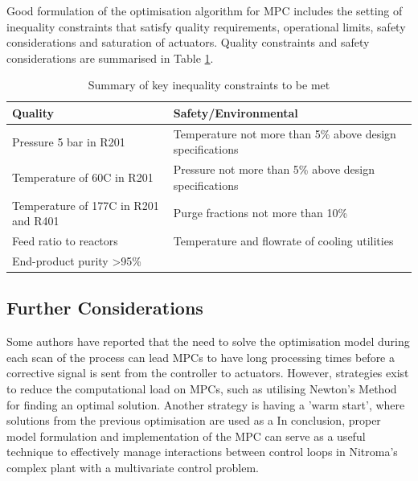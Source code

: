 Good formulation of the optimisation algorithm for MPC includes the setting of inequality constraints that satisfy quality requirements, operational limits, safety considerations and saturation of actuators. Quality constraints and safety considerations are summarised in Table \ref{tab:key-constraints}.

\begin{table}[h]
\centering
    \caption{Summary of key inequality constraints to be met}
    \label{tab:key-constraints}
\begin{tabular}{@{}ll@{}}
\toprule
\textbf{Quality}                      & \textbf{Safety/Environmental}                             \\ \midrule
Pressure 5 bar in R201                & Temperature not more than 5\% above design specifications \\
Temperature of 60C in R201            & Pressure not more than 5\% above design specifications    \\
Temperature of 177C in R201 and R401  & Purge fractions not more than 10\%                        \\
Feed ratio to reactors                & Temperature and flowrate of cooling utilities             \\
End-product purity \textgreater{}95\% &                                                           \\ \bottomrule
\end{tabular}
\end{table}

\subsection{Further Considerations}
Some authors have reported that the need to solve the optimisation model during each scan of the process can lead MPCs to have long processing times before a corrective signal is sent from the controller to actuators. However, strategies exist to reduce the computational load on MPCs, such as utilising Newton's Method for finding an optimal solution. Another strategy is having a 'warm start', where solutions from the previous optimisation are used as a      In conclusion, proper model formulation and implementation of the MPC can serve as a useful technique to effectively manage interactions between control loops in Nitroma's complex plant with a multivariate control problem.